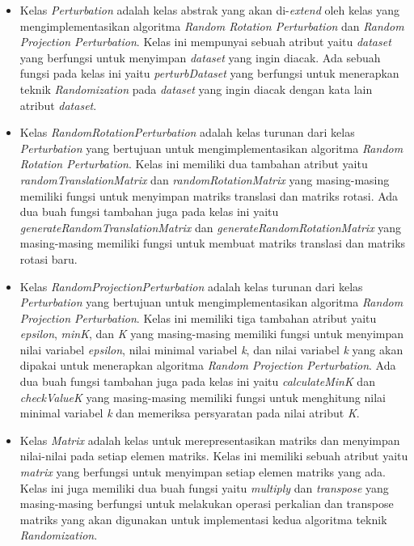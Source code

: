 \begin{itemize}
    \item Kelas \textit{Perturbation} adalah kelas abstrak yang akan di-\textit{extend} oleh kelas yang mengimplementasikan algoritma \textit{Random Rotation Perturbation} dan \textit{Random Projection Perturbation}. Kelas ini mempunyai sebuah atribut yaitu \textit{\textit{dataset}} yang berfungsi untuk menyimpan \textit{dataset} yang ingin diacak. Ada sebuah fungsi pada kelas ini yaitu \textit{perturbDataset} yang berfungsi untuk menerapkan teknik \textit{Randomization} pada \textit{dataset} yang ingin diacak dengan kata lain atribut \textit{\textit{dataset}}.
    \item Kelas \textit{RandomRotationPerturbation} adalah kelas turunan dari kelas \textit{Perturbation} yang bertujuan untuk mengimplementasikan algoritma \textit{Random Rotation Perturbation}. Kelas ini memiliki dua tambahan atribut yaitu \textit{randomTranslationMatrix} dan \textit{randomRotationMatrix} yang masing-masing memiliki fungsi untuk menyimpan matriks translasi dan matriks rotasi. Ada dua buah fungsi tambahan juga pada kelas ini yaitu \textit{generateRandomTranslationMatrix} dan \textit{generateRandomRotationMatrix} yang masing-masing memiliki fungsi untuk membuat matriks translasi dan matriks rotasi baru.
    \item Kelas \textit{RandomProjectionPerturbation} adalah kelas turunan dari kelas \textit{Perturbation} yang bertujuan untuk mengimplementasikan algoritma \textit{Random Projection Perturbation}. Kelas ini memiliki tiga tambahan atribut yaitu \textit{epsilon}, \textit{minK}, dan \textit{K} yang masing-masing memiliki fungsi untuk menyimpan nilai variabel \textit{epsilon}, nilai minimal variabel \textit{k}, dan nilai variabel \textit{k} yang akan dipakai untuk menerapkan algoritma \textit{Random Projection Perturbation}. Ada dua buah fungsi tambahan juga pada kelas ini yaitu \textit{calculateMinK} dan \textit{checkValueK} yang masing-masing memiliki fungsi untuk menghitung nilai minimal variabel \textit{k} dan memeriksa persyaratan pada nilai atribut \textit{K}.
    \item Kelas \textit{Matrix} adalah kelas untuk merepresentasikan matriks dan menyimpan nilai-nilai pada setiap elemen matriks. Kelas ini memiliki sebuah atribut yaitu \textit{matrix} yang berfungsi untuk menyimpan setiap elemen matriks yang ada. Kelas ini juga memiliki dua buah fungsi yaitu \textit{multiply} dan \textit{transpose} yang masing-masing berfungsi untuk melakukan operasi perkalian dan transpose matriks yang akan digunakan untuk implementasi kedua algoritma teknik \textit{Randomization}.

\end{itemize}
